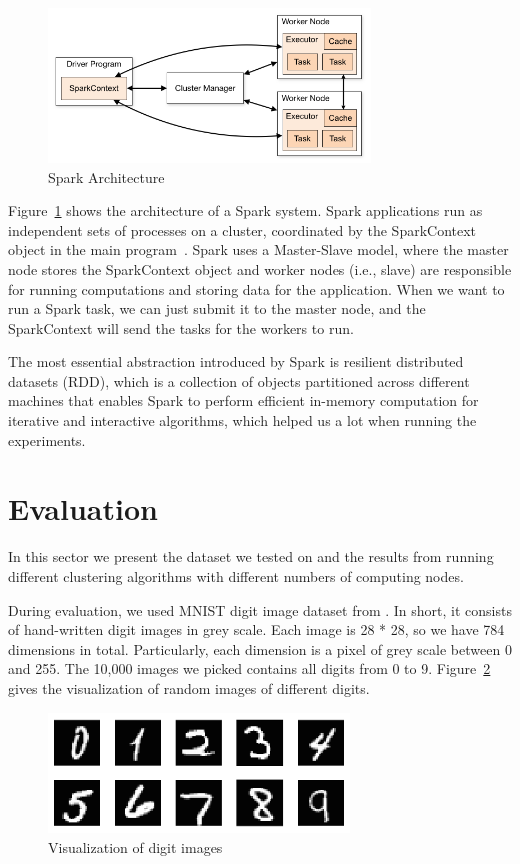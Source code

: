 \documentclass{acm_proc_article-sp}
\begin{document}
\begin{figure}[h]
\includegraphics[height=4.1cm]{spark_architecture.png}
\caption{Spark Architecture~\cite{sparkoverview}}
\label{spark_arch}
\end{figure}

Figure~\ref{spark_arch} shows the architecture of a Spark system. Spark applications run as independent sets of processes on a cluster, coordinated by the SparkContext object in the main program~\cite{sparkoverview}. Spark uses a Master-Slave model, where the master node stores the SparkContext object and worker nodes (i.e., slave) are responsible for running computations and storing data for the application. When we want to run a Spark task, we can just submit it to the master node, and the SparkContext will send the tasks for the workers to run.

The most essential abstraction introduced by Spark is resilient distributed datasets (RDD), which is a collection of objects partitioned across different machines that enables Spark to perform efficient in-memory computation for iterative and interactive algorithms, which helped us a lot when running the experiments.

\section{Evaluation}
In this sector we present the dataset we tested on and the results from running different clustering algorithms with different numbers of computing nodes.

During evaluation, we used MNIST digit image dataset from \cite{mnistdigit}. In short, it consists of hand-written digit images in grey scale. Each image is 28 * 28, so we have 784 dimensions in total. Particularly, each dimension is a pixel of grey scale between 0 and 255. The 10,000 images we picked contains all digits from 0 to 9. Figure~\ref{visual_digits} gives the visualization of random images of different digits.

\begin{figure}[h]
\centering
\includegraphics[height=3.2cm]{digits.png}
\caption{Visualization of digit images}
\label{visual_digits}
\end{figure}
\end{document}
